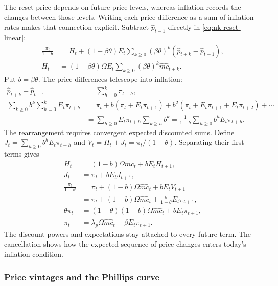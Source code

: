 The reset price depends on future price levels, whereas inflation records
the changes between those levels. Writing each price difference as a sum of
inflation rates makes that connection explicit. Subtract $\hat p_{t-1}$ directly in \eqref{eq:nk-reset-linear}:
\begin{align}
 \frac{\pi_t}{1-\theta}
 &=H_t+(1-\beta\theta)E_t\sum_{k\geq0}(\beta\theta)^k
                        (\hat p_{t+k}-\hat p_{t-1}),\\
 H_t&=(1-\beta\theta)\Omega E_t\sum_{k\geq0}(\beta\theta)^k
                         \hat{mc}_{t+k}.
\end{align}
Put $b=\beta\theta$. The price differences telescope into inflation:
\begin{align}
 \hat p_{t+k}-\hat p_{t-1}&=\sum_{h=0}^k\pi_{t+h},\\
 \sum_{k\geq0}b^k\sum_{h=0}^kE_t\pi_{t+h}
 &=\pi_t+b(\pi_t+E_t\pi_{t+1})
       +b^2(\pi_t+E_t\pi_{t+1}+E_t\pi_{t+2})+\cdots\\
 &=\sum_{h\geq0}E_t\pi_{t+h}\sum_{k\geq h}b^k
 =\frac1{1-b}\sum_{h\geq0}b^hE_t\pi_{t+h}.
\end{align}
The rearrangement requires convergent expected discounted sums. Define
$J_t=\sum_{h\geq0}b^hE_t\pi_{t+h}$ and
$V_t=H_t+J_t=\pi_t/(1-\theta)$. Separating their first terms gives
\begin{align}
 H_t&=(1-b)\Omega\hat{mc}_t+bE_tH_{t+1},\\
 J_t&=\pi_t+bE_tJ_{t+1},\\
 \frac{\pi_t}{1-\theta}
 &=\pi_t+(1-b)\Omega\hat{mc}_t+bE_tV_{t+1}\\
 &=\pi_t+(1-b)\Omega\hat{mc}_t
                  +\frac{b}{1-\theta}E_t\pi_{t+1},\\
 \theta\pi_t&=(1-\theta)(1-b)\Omega\hat{mc}_t+bE_t\pi_{t+1},\\
 \pi_t&=\lambda_p\Omega\hat{mc}_t+\beta E_t\pi_{t+1}.
\end{align}
The discount powers and expectations stay attached to every future term.
The cancellation shows how the expected sequence of price changes enters
today's inflation condition.

\subsubsection{Price vintages and the Phillips curve}

